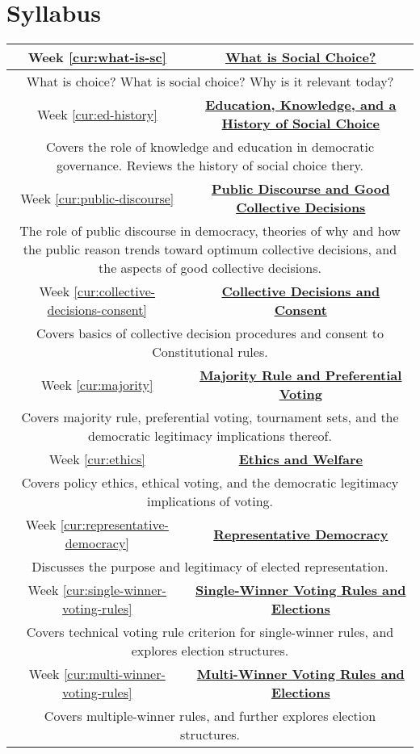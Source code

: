 
\chapter{Syllabus}

{
    \newcommand{\sylweek}[3]{

        Week \ref{cur:#1} & \textbf{\hyperref[cur:#1]{#2}} \\
        \hline
        \multicolumn{2}{|X|}{\centering
            #3
        } \\
        \hline
    }
    \begin{table}[h]
        \label{syllabus}
        \centering
        \begin{tabularx}{\linewidth}{|c|c|}
            \hline

            \sylweek{what-is-sc}{What is Social Choice?}{What is choice?  What is social choice?  Why is it relevant today?}

            \sylweek{ed-history}{Education, Knowledge, and a History of Social Choice}{Covers the role of knowledge and education in democratic governance.  Reviews the history of social choice thery.}

            \sylweek{public-discourse}{Public Discourse and Good Collective Decisions}{The role of public discourse in democracy, theories of why and how the public reason trends toward optimum collective decisions, and the aspects of good collective decisions.}

            \sylweek{collective-decisions-consent}{Collective Decisions and Consent}{Covers basics of collective decision procedures and consent to  Constitutional rules.}

            \sylweek{majority}{Majority Rule and Preferential Voting}{Covers majority rule, preferential voting, tournament sets, and the democratic legitimacy implications thereof.}

            \sylweek{ethics}{Ethics and Welfare}{Covers policy ethics, ethical voting, and the democratic legitimacy implications of voting.}

            \sylweek{representative-democracy}{Representative Democracy}{Discusses the purpose and legitimacy of elected representation.}

            \sylweek{single-winner-voting-rules}{Single-Winner Voting Rules and Elections}{Covers technical voting rule criterion for single-winner rules, and explores election structures.}

            \sylweek{multi-winner-voting-rules}{Multi-Winner Voting Rules and Elections}{Covers multiple-winner rules, and further explores election structures.}


\end{tabularx}
\end{table}}
